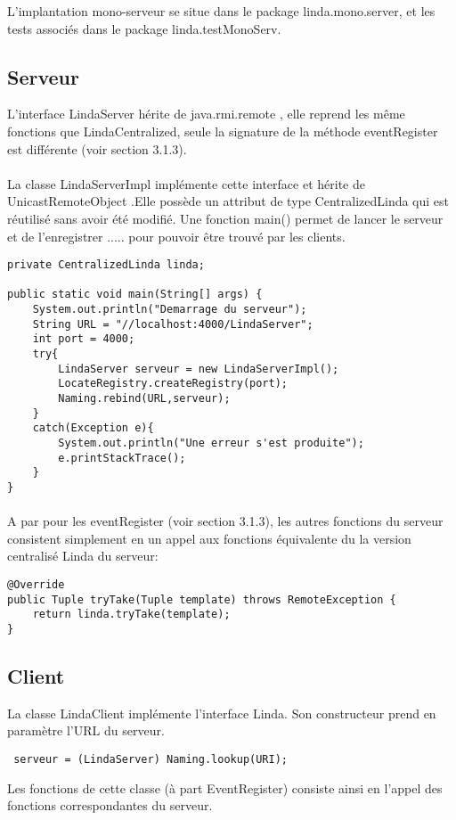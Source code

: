 \documentclass{report}
\begin{document}
L'implantation mono-serveur se situe dans le package linda.mono.server, et les tests associés dans le package linda.testMonoServ.

\subsection{Serveur}
L'interface LindaServer hérite de java.rmi.remote , elle reprend les même fonctions que LindaCentralized, seule la signature de la méthode eventRegister est différente (voir section 3.1.3).
\paragraph{}La classe LindaServerImpl implémente cette interface et hérite de UnicastRemoteObject .Elle possède un attribut de type CentralizedLinda qui est réutilisé sans avoir été modifié.
Une fonction main() permet de lancer le serveur et de l'enregistrer ..... pour pouvoir être trouvé par les clients. 
\begin{lstlisting}
private CentralizedLinda linda;
	
public static void main(String[] args) {
	System.out.println("Demarrage du serveur");	
	String URL = "//localhost:4000/LindaServer";
	int port = 4000;
	try{
		LindaServer serveur = new LindaServerImpl();
		LocateRegistry.createRegistry(port);
		Naming.rebind(URL,serveur);
	}
	catch(Exception e){
		System.out.println("Une erreur s'est produite");
		e.printStackTrace();
	}	
}
\end{lstlisting}
\newpage
\paragraph{}A par pour les eventRegister (voir section 3.1.3), les autres fonctions du serveur consistent simplement en un appel aux fonctions équivalente du la version centralisé Linda du serveur:
\begin{lstlisting}
@Override
public Tuple tryTake(Tuple template) throws RemoteException {
	return linda.tryTake(template);
}
\end{lstlisting}
\subsection{Client}
La classe LindaClient implémente l'interface Linda.
Son constructeur prend en paramètre l'URL du serveur.
\begin{lstlisting}
 serveur = (LindaServer) Naming.lookup(URI);
\end{lstlisting}
Les fonctions de cette classe (à part EventRegister) consiste ainsi en l'appel des fonctions correspondantes du serveur.
\end{document}
